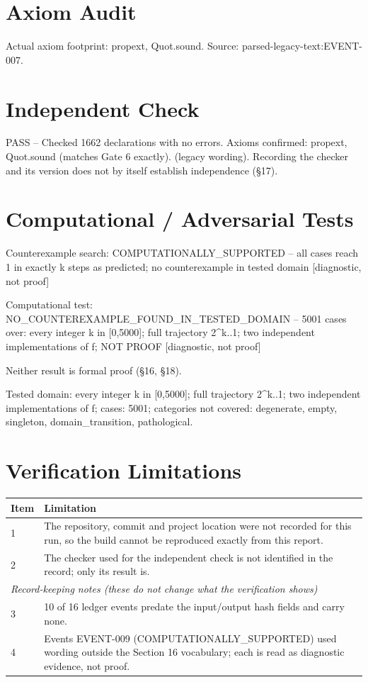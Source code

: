 \documentclass[11pt]{article}
\begin{document}
\section{Axiom Audit}
Actual axiom footprint: propext, Quot.sound.
Source: parsed-legacy-text:EVENT-007.
\section{Independent Check}
PASS -- Checked 1662 declarations with no errors. Axioms confirmed: propext, Quot.sound (matches Gate 6 exactly).  (legacy wording).
Recording the checker and its version does not by itself establish independence (\S{}17).
\section{Computational / Adversarial Tests}
Counterexample search: COMPUTATIONALLY\_SUPPORTED -- all cases reach 1 in exactly k steps as predicted; no counterexample in tested domain [diagnostic, not proof]

Computational test: NO\_COUNTEREXAMPLE\_FOUND\_IN\_TESTED\_DOMAIN -- 5001 cases over: every integer k in [0,5000]; full trajectory 2\textasciicircum{}k..1; two independent implementations of f; NOT PROOF [diagnostic, not proof]

Neither result is formal proof (\S{}16, \S{}18).

Tested domain: every integer k in [0,5000]; full trajectory 2\textasciicircum{}k..1; two independent implementations of f; cases: 5001; categories not covered: degenerate, empty, singleton, domain\_transition, pathological.
\section{Verification Limitations}
\begin{longtable}{p{}p{}}
\toprule Item & Limitation \\ \midrule \endhead
1 & The repository, commit and project location were not recorded for this run, so the build cannot be reproduced exactly from this report. \\
2 & The checker used for the independent check is not identified in the record; only its result is. \\
\midrule \multicolumn{2}{l}{\textit{Record-keeping notes (these do not change what the verification shows)}} \\ \midrule
3 & 10 of 16 ledger events predate the input/output hash fields and carry none. \\
4 & Events EVENT-009 (COMPUTATIONALLY\_SUPPORTED) used wording outside the Section 16 vocabulary; each is read as diagnostic evidence, not proof. \\
\bottomrule
\end{longtable}
\end{document}

